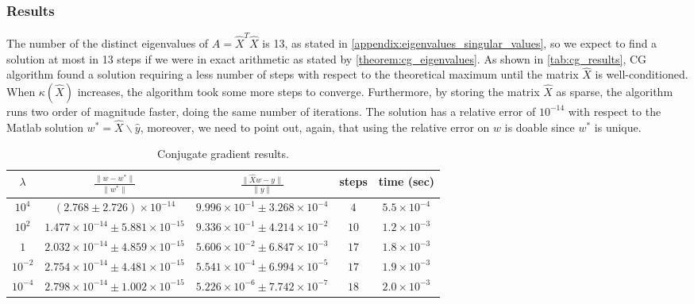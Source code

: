\subsubsection{Results}
The number of the distinct eigenvalues of $A = \hat{X}^{T} \hat{X}$ is 13, as stated in \ref{appendix:eigenvalues_singular_values}, so we expect to find a solution at most in 13 steps if we were in exact arithmetic as stated by \autoref{theorem:cg_eigenvalues}. As shown in \autoref{tab:cg_results}, CG algorithm found a solution requiring a less number of steps with respect to the theoretical maximum until the matrix $\hat{X}$ is well-conditioned. When $\kappa(\hat{X})$ increases, the algorithm took some more steps to converge. Furthermore, by storing the matrix $\hat{X}$ as sparse, the algorithm runs two order of magnitude faster, doing the same number of iterations. The solution has a relative error of $10^{-14}$ with respect to the Matlab solution $w^* = \hat{X}\backslash \hat{y}$, moreover, we need to point out, again, that using the relative error on $w$ is doable since $w^*$ is unique.
\begin{table}[H]
\centering
\begin{tabular}{c|c|c|c|c} \hline \hline
    $\lambda$&$\frac{\lVert w - w^{*} \lVert}{\rVert w^{*} \lVert}$ & $\frac{\lVert \hat{X}w - y \lVert }{\lVert y \lVert}$ & steps & time (sec)\\ \hline \hline
    
    \rowcolor{gray!30} $10^4$ & $(2.768 \pm 2.726)\times 10^{-14}$ & $ 9.996 \times 10^{-1} \pm 3.268 \times 10^{-4}$ & $4$& $5.5 \times 10^{-4}$\\
    
    $10^2$ & $ 1.477 \times 10^{-14} \pm 5.881 \times 10^{-15}$ & $ 9.336 \times 10^{-1} \pm 4.214 \times 10^{-2}$ & $10$& $1.2 \times 10^{-3}$\\
    
    \rowcolor{gray!30} $1$ & $2.032\times 10^{-14} \pm 4.859 \times 10^{-15} $ & $ 5.606 \times 10^{-2} \pm 6.847 \times 10^{-3} $ & $17$& $1.8 \times 10^{-3}$\\
    
    $10^{-2}$ & $2.754 \times 10^{-14} \pm 4.481 \times 10^{-15}$ & $5.541 \times 10^{-4} \pm 6.994 \times 10^{-5}$ & $17$& $1.9 \times 10^{-3}$\\
    
    \rowcolor{gray!30} $10^{-4}$ & $2.798 \times 10^{-14} \pm 1.002 \times 10^{-15}$ & $5.226 \times 10^{-6} \pm 7.742 \times 10^{-7}$ & $18$ & $2.0 \times 10^{-3}$ \\
    \hline \hline
\end{tabular}
\caption{Conjugate gradient results.}
\label{tab:cg_results}
\end{table}

